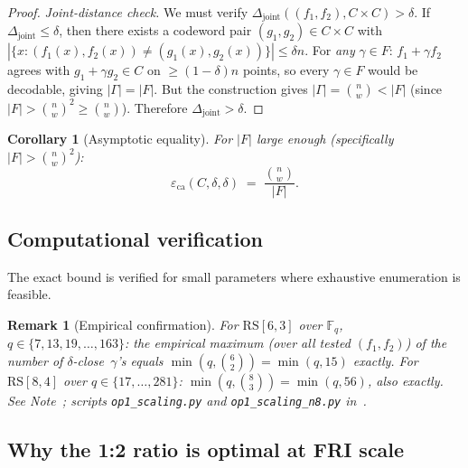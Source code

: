 \documentclass[11pt]{article}
\newtheorem{corollary}[theorem]{Corollary}
\newtheorem{remark}[theorem]{Remark}
\newcommand{\FF}{\mathbb{F}}
\begin{document}
\begin{proof}
\emph{Joint-distance check.} We must verify $\Delta_{\mathrm{joint}}((f_1, f_2), C \times C) > \delta$. If $\Delta_{\mathrm{joint}} \leq \delta$, then there exists a codeword pair $(g_1, g_2) \in C \times C$ with $|\{x : (f_1(x), f_2(x)) \neq (g_1(x), g_2(x))\}| \leq \delta n$. For \emph{any} $\gamma \in F$: $f_1 + \gamma f_2$ agrees with $g_1 + \gamma g_2 \in C$ on $\geq (1 - \delta) n$ points, so every $\gamma \in F$ would be decodable, giving $|\Gamma| = |F|$. But the construction gives $|\Gamma| = \binom{n}{w} < |F|$ (since $|F| > \binom{n}{w}^2 \geq \binom{n}{w}$). Therefore $\Delta_{\mathrm{joint}} > \delta$.
\end{proof}

\begin{corollary}[Asymptotic equality]
\label{cor:eq-threshold-equality}
For $|F|$ large enough (specifically $|F| > \binom{n}{w}^2$):
$$\varepsilon_{\mathrm{ca}}(C, \delta, \delta) \;=\; \frac{\binom{n}{w}}{|F|}.$$
\end{corollary}

\subsection{Computational verification}

The exact bound is verified for small parameters where exhaustive enumeration is feasible.

\begin{remark}[Empirical confirmation]
\label{rem:eq-threshold-empirical}
For $\mathrm{RS}[6, 3]$ over $\FF_q$, $q \in \{7, 13, 19, \ldots, 163\}$: the empirical maximum (over all tested $(f_1, f_2)$) of the number of $\delta$-close~$\gamma$'s equals $\min(q, \binom{6}{2}) = \min(q, 15)$ exactly. For $\mathrm{RS}[8, 4]$ over $q \in \{17, \ldots, 281\}$: $\min(q, \binom{8}{3}) = \min(q, 56)$, also exactly. See Note~\cite{Note0089}; scripts \texttt{op1\_scaling.py} and \texttt{op1\_scaling\_n8.py} in~\cite{CompanionRepo}.
\end{remark}

\subsection{Why the 1:2 ratio is optimal at FRI scale}
\end{document}
